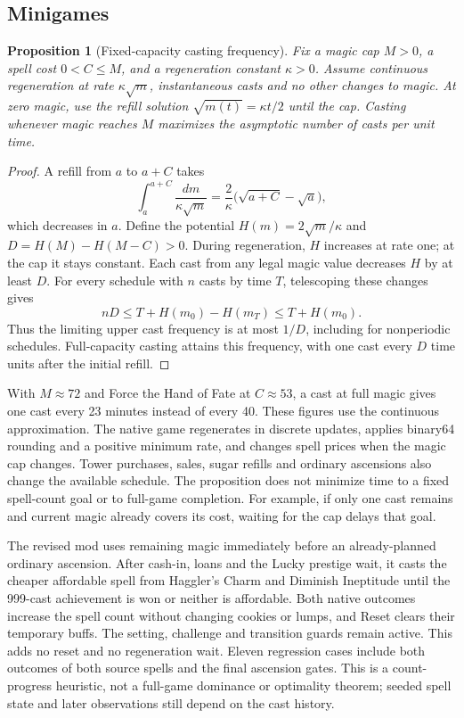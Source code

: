 \documentclass[11pt,a4paper]{article}
\numberwithin{equation}{section}
\newtheorem{proposition}[theorem]{Proposition}
\theoremstyle{definition}
\theoremstyle{remark}
\begin{document}
\subsection{Minigames}\label{sec:minigames}
\begin{proposition}[Fixed-capacity casting frequency]\label{prop:grimoire}
Fix a magic cap $M>0$, a spell cost $0<C\le M$, and a regeneration constant $\kappa>0$. Assume continuous regeneration at rate $\kappa\sqrt m$, instantaneous casts and no other changes to magic. At zero magic, use the refill solution $\sqrt{m(t)}=\kappa t/2$ until the cap. Casting whenever magic reaches $M$ maximizes the asymptotic number of casts per unit time.
\end{proposition}

\begin{proof}
A refill from $a$ to $a+C$ takes
\[
 \int_a^{a+C}\frac{dm}{\kappa\sqrt m}=\frac2\kappa\bigl(\sqrt{a+C}-\sqrt a\bigr),
\]
which decreases in $a$. Define the potential $H(m)=2\sqrt m/\kappa$ and $D=H(M)-H(M-C)>0$. During regeneration, $H$ increases at rate one; at the cap it stays constant. Each cast from any legal magic value decreases $H$ by at least $D$. For every schedule with $n$ casts by time $T$, telescoping these changes gives
\[
 nD\le T+H(m_0)-H(m_T)\le T+H(m_0).
\]
Thus the limiting upper cast frequency is at most $1/D$, including for nonperiodic schedules. Full-capacity casting attains this frequency, with one cast every $D$ time units after the initial refill.
\end{proof}

With $M\approx72$ and Force the Hand of Fate at $C\approx53$, a cast at full magic gives one cast every 23 minutes instead of every 40.
These figures use the continuous approximation. The native game regenerates in discrete updates, applies binary64 rounding and a positive minimum rate, and changes spell prices when the magic cap changes. Tower purchases, sales, sugar refills and ordinary ascensions also change the available schedule. The proposition does not minimize time to a fixed spell-count goal or to full-game completion. For example, if only one cast remains and current magic already covers its cost, waiting for the cap delays that goal.

The revised mod uses remaining magic immediately before an already-planned ordinary ascension. After cash-in, loans and the Lucky prestige wait, it casts the cheaper affordable spell from Haggler's Charm and Diminish Ineptitude until the 999-cast achievement is won or neither is affordable. Both native outcomes increase the spell count without changing cookies or lumps, and Reset clears their temporary buffs. The setting, challenge and transition guards remain active. This adds no reset and no regeneration wait. Eleven regression cases include both outcomes of both source spells and the final ascension gates. This is a count-progress heuristic, not a full-game dominance or optimality theorem; seeded spell state and later observations still depend on the cast history.
\end{document}
